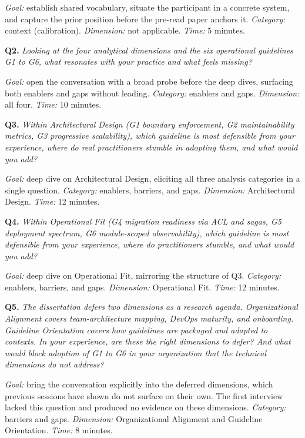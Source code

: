 \noindent\emph{Goal:} establish shared vocabulary, situate the participant in a concrete system, and capture the prior position before the pre-read paper anchors it. \emph{Category:} context (calibration). \emph{Dimension:} not applicable. \emph{Time:} 5 minutes.

\medskip
\noindent\textbf{Q2.} \emph{Looking at the four analytical dimensions and the six operational guidelines G1 to G6, what resonates with your practice and what feels missing?}

\noindent\emph{Goal:} open the conversation with a broad probe before the deep dives, surfacing both enablers and gaps without leading. \emph{Category:} enablers and gaps. \emph{Dimension:} all four. \emph{Time:} 10 minutes.

\medskip
\noindent\textbf{Q3.} \emph{Within Architectural Design (G1 boundary enforcement, G2 maintainability metrics, G3 progressive scalability), which guideline is most defensible from your experience, where do real practitioners stumble in adopting them, and what would you add?}

\noindent\emph{Goal:} deep dive on Architectural Design, eliciting all three analysis categories in a single question. \emph{Category:} enablers, barriers, and gaps. \emph{Dimension:} Architectural Design. \emph{Time:} 12 minutes.

\medskip
\noindent\textbf{Q4.} \emph{Within Operational Fit (G4 migration readiness via ACL and sagas, G5 deployment spectrum, G6 module-scoped observability), which guideline is most defensible from your experience, where do practitioners stumble, and what would you add?}

\noindent\emph{Goal:} deep dive on Operational Fit, mirroring the structure of Q3. \emph{Category:} enablers, barriers, and gaps. \emph{Dimension:} Operational Fit. \emph{Time:} 12 minutes.

\medskip
\noindent\textbf{Q5.} \emph{The dissertation defers two dimensions as a research agenda. Organizational Alignment covers team-architecture mapping, DevOps maturity, and onboarding. Guideline Orientation covers how guidelines are packaged and adapted to contexts. In your experience, are these the right dimensions to defer? And what would block adoption of G1 to G6 in your organization that the technical dimensions do not address?}

\noindent\emph{Goal:} bring the conversation explicitly into the deferred dimensions, which previous sessions have shown do not surface on their own. The first interview lacked this question and produced no evidence on these dimensions. \emph{Category:} barriers and gaps. \emph{Dimension:} Organizational Alignment and Guideline Orientation. \emph{Time:} 8 minutes.

